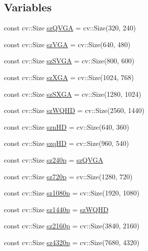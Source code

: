 \subsection*{Variables}
\begin{DoxyCompactItemize}
\item 
const cv\-::\-Size \hyperlink{namespaceperf_a8d3d0bf3b89981e67bc30a3bd2befde1}{sz\-Q\-V\-G\-A} = cv\-::\-Size(320, 240)
\item 
const cv\-::\-Size \hyperlink{namespaceperf_a198109adcb948fd8823f5fd653ae4813}{sz\-V\-G\-A} = cv\-::\-Size(640, 480)
\item 
const cv\-::\-Size \hyperlink{namespaceperf_a8188190bc9ebd429fb46c05c671009c6}{sz\-S\-V\-G\-A} = cv\-::\-Size(800, 600)
\item 
const cv\-::\-Size \hyperlink{namespaceperf_a5e19cb1374414c082b73208f4893bb90}{sz\-X\-G\-A} = cv\-::\-Size(1024, 768)
\item 
const cv\-::\-Size \hyperlink{namespaceperf_af0980e07fe76ff27e882ecd10f34be75}{sz\-S\-X\-G\-A} = cv\-::\-Size(1280, 1024)
\item 
const cv\-::\-Size \hyperlink{namespaceperf_a7d5416da78b41a2c9c541594c7168464}{sz\-W\-Q\-H\-D} = cv\-::\-Size(2560, 1440)
\item 
const cv\-::\-Size \hyperlink{namespaceperf_af94d4bf8af282e3aa46c9d1f85630225}{szn\-H\-D} = cv\-::\-Size(640, 360)
\item 
const cv\-::\-Size \hyperlink{namespaceperf_a2aec1a98d3dfcd2d7f5546d61eb4e24c}{szq\-H\-D} = cv\-::\-Size(960, 540)
\item 
const cv\-::\-Size \hyperlink{namespaceperf_a92903038b656ae2b6620911dd2097efd}{sz240p} = \hyperlink{namespaceperf_a8d3d0bf3b89981e67bc30a3bd2befde1}{sz\-Q\-V\-G\-A}
\item 
const cv\-::\-Size \hyperlink{namespaceperf_a6ede89be4112c563e5f2c046f3cee64f}{sz720p} = cv\-::\-Size(1280, 720)
\item 
const cv\-::\-Size \hyperlink{namespaceperf_ad795e18c34cc44bf1f2d59896d6e9d4d}{sz1080p} = cv\-::\-Size(1920, 1080)
\item 
const cv\-::\-Size \hyperlink{namespaceperf_a07606d46d2938bf6d9769ef87c6ddf11}{sz1440p} = \hyperlink{namespaceperf_a7d5416da78b41a2c9c541594c7168464}{sz\-W\-Q\-H\-D}
\item 
const cv\-::\-Size \hyperlink{namespaceperf_af269eb69cb3ed2ca1ced688349d96118}{sz2160p} = cv\-::\-Size(3840, 2160)
\item 
const cv\-::\-Size \hyperlink{namespaceperf_a0abef7f9f2f4c44b279ef47a55c91bbd}{sz4320p} = cv\-::\-Size(7680, 4320)

\end{DoxyCompactItemize}
